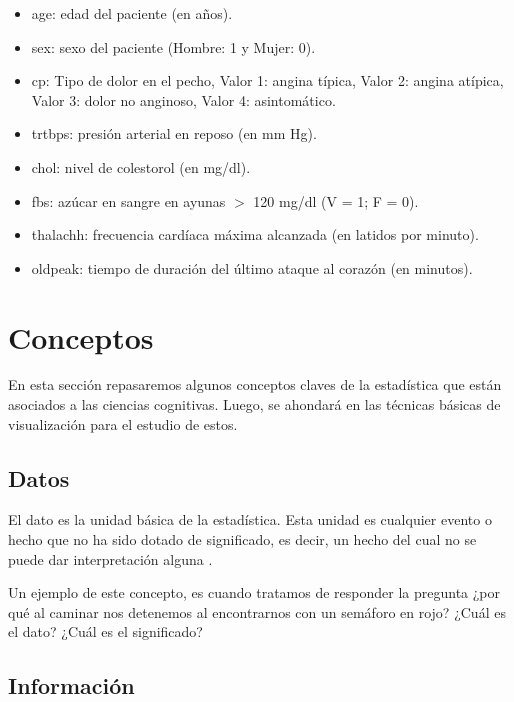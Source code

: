 \documentclass[
  11pt,
]{book}
\providecommand{\tightlist}{%
  \setlength{\itemsep}{0pt}\setlength{\parskip}{0pt}}
\theoremstyle{definition}
\theoremstyle{definition}
\theoremstyle{definition}
\theoremstyle{definition}
\theoremstyle{remark}
\begin{document}
\begin{itemize}
  \begin{itemize}
  \tightlist
  \item
    age: edad del paciente (en años).
  \item
    sex: sexo del paciente (Hombre: 1 y Mujer: 0).
  \item
    cp: Tipo de dolor en el pecho, Valor 1: angina típica, Valor 2: angina atípica, Valor 3: dolor no anginoso, Valor 4: asintomático.
  \item
    trtbps: presión arterial en reposo (en mm Hg).
  \item
    chol: nivel de colestorol (en mg/dl).
  \item
    fbs: azúcar en sangre en ayunas \(>\) 120 mg/dl (V = 1; F = 0).
  \item
    thalachh: frecuencia cardíaca máxima alcanzada (en latidos por minuto).
  \item
    oldpeak: tiempo de duración del último ataque al corazón (en minutos).
  \end{itemize}
\end{itemize}

\section{Conceptos}\label{conceptos}

En esta sección repasaremos algunos conceptos claves de la estadística que están asociados a las ciencias cognitivas. Luego, se ahondará en las técnicas básicas de visualización para el estudio de estos.

\subsection{Datos}\label{datos}

El dato es la unidad básica de la estadística. Esta unidad es cualquier evento o hecho que no ha sido dotado de significado, es decir, un hecho del cual no se puede dar interpretación alguna \citep{brachman_knowledge_2004}.

Un ejemplo de este concepto, es cuando tratamos de responder la pregunta ¿por qué al caminar nos detenemos al encontrarnos con un semáforo en rojo? ¿Cuál es el dato? ¿Cuál es el significado?

\subsection{Información}\label{informaciuxf3n}
\end{document}
